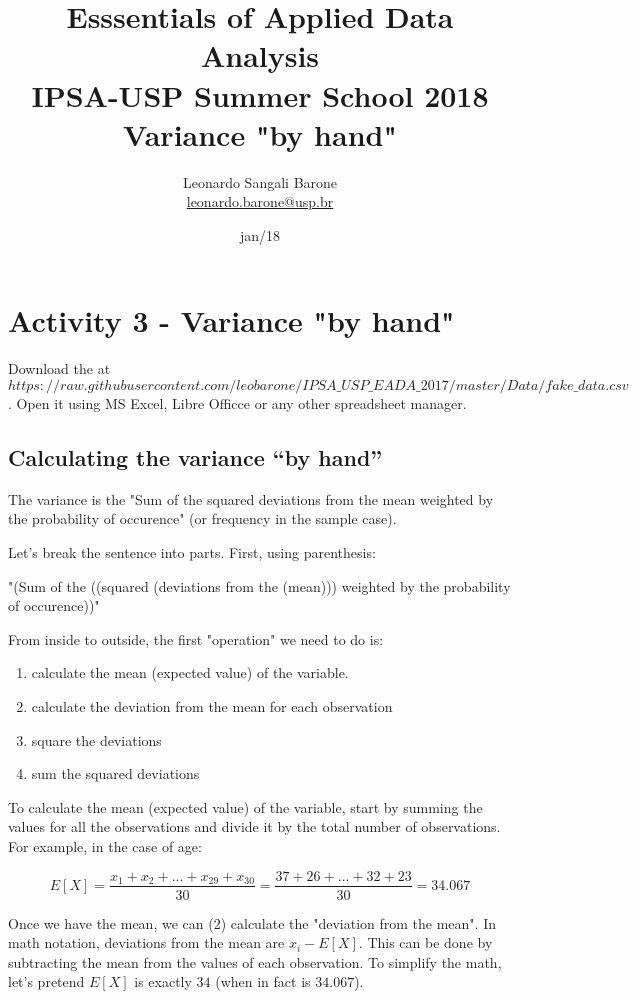 \documentclass[11pt]{article}
\title{\textbf{Esssentials of Applied Data Analysis\\
				IPSA-USP Summer School 2018}\newline\\
				Variance "by hand"}
\author{Leonardo Sangali Barone\\ \href{leonardo.barone@usp.br}{leonardo.barone@usp.br}}
\date{jan/18}
\begin{document}
\maketitle

\section*{Activity 3 - Variance "by hand"
}


Download the at 
\[https://raw.githubusercontent.com/leobarone/IPSA\_USP\_EADA\_2017/master/Data/fake\_data.csv\]. 
Open it using MS Excel, Libre Officce or any other spreadsheet manager.

\subsection*{Calculating the variance ``by hand''}

The variance is the "Sum of the squared deviations from the mean weighted by the probability of occurence" (or frequency in the sample case).

Let's break the sentence into parts. First, using parenthesis:

"(Sum of the ((squared (deviations from the (mean))) weighted by the probability of occurence))"

From inside to outside, the first "operation" we need to do is:

\begin{enumerate}
		\item calculate the mean (expected value) of the variable.
		\item calculate the deviation from the mean for each observation
		\item square the deviations
		\item sum the squared deviations
\end{enumerate}

To calculate the mean (expected value) of the variable, start by summing the values for all the observations and divide it by the total number of observations. For example, in the case of age:

\[E[X] = \frac{x_1 + x_2 + ... + x_{29} + x_{30}}{30} = \frac{37+26+...+32+23}{30} = 34.067\]

Once we have the mean, we can (2) calculate the "deviation from the mean". In math notation, deviations from the mean are $x_i - E[X]$. This can be done by subtracting the mean from the values of each observation. To simplify the math, let's pretend $E[X]$ is exactly $34$ (when in fact is $34.067$).\\
\end{document}
